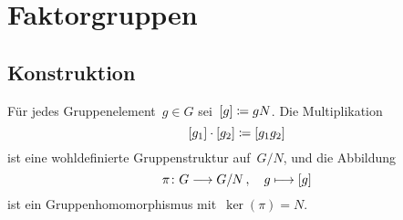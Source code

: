 %
%
%
%  
%
%
%





\section{Faktorgruppen}



\subsection{Konstruktion}

Für jedes Gruppenelement~$g \in G$ sei~$[g] \coloneqq gN$.
Die Multiplikation
\[
  [g_1] \cdot [g_2]
  \coloneqq
  [g_1 g_2]
\]
ist eine wohldefinierte Gruppenstruktur auf~$G/N$, und die Abbildung
\[
  \pi
  \colon
  G \to G/N \,,
  \quad
  g \mapsto \class{g}
\]
ist ein Gruppenhomomorphismus mit~$\ker(\pi) = N$.

